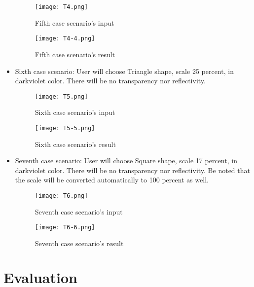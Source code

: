 \documentclass{article}
\begin{document}
\begin{itemize}
\begin{figure}[H]
\centering
\texttt{[image: T4.png]}
\caption{Fifth case scenario's input \label{test5}}
\end{figure}

\begin{figure}
    \centering
    \texttt{[image: T4-4.png]}
    \caption{Fifth case scenario's result}
    \label{test5}
\end{figure}

\item Sixth case scenario: \newline
User will choose Triangle shape, scale 25 percent, in darkviolet color. There will be no transparency nor reflectivity. 

\begin{figure}[H]
\centering
\texttt{[image: T5.png]}
\caption{Sixth case scenario's input \label{test6}}
\end{figure}

\begin{figure}
    \centering
    \texttt{[image: T5-5.png]}
    \caption{Sixth case scenario's result}
    \label{test6}
\end{figure}

\item Seventh case scenario: \newline
User will choose Square shape, scale 17 percent, in darkviolet color. There will be no transparency nor reflectivity. Be noted that the scale will be converted automatically to 100 percent as well.

\begin{figure}[H]
\centering
\texttt{[image: T6.png]}
\caption{Seventh case scenario's input \label{test7}}
\end{figure}

\begin{figure}
    \centering
    \texttt{[image: T6-6.png]}
    \caption{Seventh case scenario's result}
    \label{test7}
\end{figure}

\end{itemize}



 \newpage
\newpage


\section{Evaluation}
\end{document}
